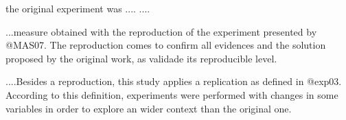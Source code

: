the original experiment was .... ....

...measure obtained with the reproduction of the experiment presented by @MAS07. The reproduction comes to confirm all evidences and the solution proposed by the original work, as validade its reproducible level.

....Besides a reproduction, this study applies a replication as defined in @exp03. According to this definition, experiments were performed with changes in some variables in order to explore an wider context than the original one. 

